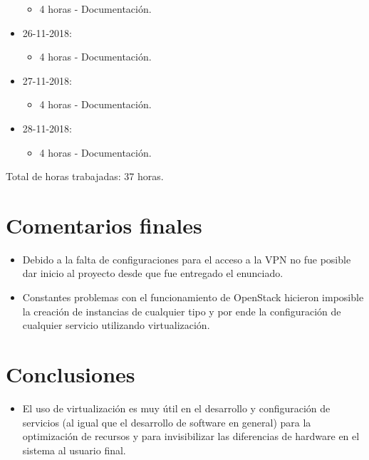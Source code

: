 \documentclass{article}
\begin{document}
\begin{itemize}
  \begin{itemize}
    \item 4 horas - Documentaci\'on.
  \end{itemize}
  \item 26-11-2018:
  \begin{itemize}
    \item 4 horas - Documentaci\'on.
  \end{itemize}
  \item 27-11-2018:
  \begin{itemize}
    \item 4 horas - Documentaci\'on.
  \end{itemize}
  \item 28-11-2018:
  \begin{itemize}
    \item 4 horas - Documentaci\'on.
  \end{itemize}
\end{itemize}
Total de horas trabajadas: 37 horas.

\section{Comentarios finales}
\begin{itemize}
  \item Debido a la falta de configuraciones para el acceso a la VPN no fue posible dar inicio al proyecto desde que fue entregado el enunciado.
  \item Constantes problemas con el funcionamiento de OpenStack hicieron imposible la creaci\'on de instancias de cualquier tipo y por ende la configuraci\'on de cualquier servicio utilizando virtualizaci\'on.
\end{itemize}

\section{Conclusiones}
\begin{itemize}
  \item El uso de virtualizaci\'on es muy \'util en el desarrollo y configuraci\'on de servicios (al igual que el desarrollo de software en general) para la optimizaci\'on de recursos y para invisibilizar las diferencias de hardware en el sistema al usuario final.
\end{itemize}
\end{document}
